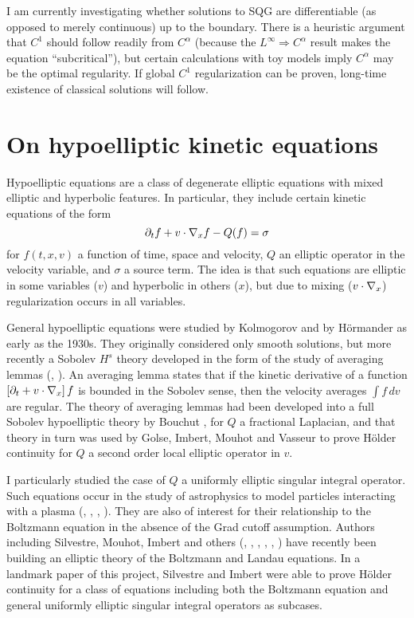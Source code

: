 I am currently investigating whether solutions to SQG are differentiable (as opposed to merely continuous) up to the boundary.  There is a heuristic argument that $C^1$ should follow readily from $C^\alpha$ (because the $L^\infty \Rightarrow C^\alpha$ result makes the equation ``subcritical''), but certain calculations with toy models imply $C^\alpha$ may be the optimal regularity.  If global $C^1$ regularization can be proven, long-time existence of classical solutions will follow.  


\section{On hypoelliptic kinetic equations} \label{sec:hypo}
Hypoelliptic equations are a class of degenerate elliptic equations with mixed elliptic and hyperbolic features.  In particular, they include certain kinetic equations of the form
\begin{equation} \label{eq:hypo} \partial_t f + v\cdot \nabla_x f - Q(f) = \sigma \end{equation}
for $f(t,x,v)$ a function of time, space and velocity, $Q$ an elliptic operator in the velocity variable, and $\sigma$ a source term.  The idea is that such equations are elliptic in some variables ($v$) and hyperbolic in others ($x$), but due to mixing ($v \cdot \nabla_x$) regularization occurs in all variables.  

General hypoelliptic equations were studied by Kolmogorov and by H\"{o}rmander \cite{Ho} as early as the 1930s.  They originally considered only smooth solutions, but more recently a Sobolev $H^s$ theory developed in the form of the study of averaging lemmas (\cite{Ag}, \cite{GoLiPeSe}).  An averaging lemma states that if the kinetic derivative of a function $\left[ \partial_t + v\cdot\nabla_x \right] f$ is bounded in the Sobolev sense, then the velocity averages $\int f \,dv$ are regular.  The theory of averaging lemmas had been developed into a full Sobolev hypoelliptic theory by Bouchut \cite{Bo}, for $Q$ a fractional Laplacian, and that theory in turn was used by Golse, Imbert, Mouhot and Vasseur \cite{GoImMoVa} to prove H\"{o}lder continuity for $Q$ a second order local elliptic operator in $v$.  

I particularly studied the case of $Q$ a uniformly elliptic singular integral operator.  Such equations occur in the study of astrophysics to model particles interacting with a plasma (\cite{Ka}, \cite{Go.physics}, \cite{LaKe}, \cite{MeRo}).  They are also of interest for their relationship to the Boltzmann equation in the absence of the Grad cutoff assumption.  Authors including Silvestre, Mouhot, Imbert and others (\cite{ImSi}, \cite{ImMoSi}, \cite{Mo}, \cite{Si}, \cite{HeSnTa}, \cite{HeSn}) have recently been building an elliptic theory of the Boltzmann and Landau equations.  In a landmark paper of this project, Silvestre and Imbert were able to prove H\"{o}lder continuity for a class of equations including both the Boltzmann equation and general uniformly elliptic singular integral operators as subcases.  

